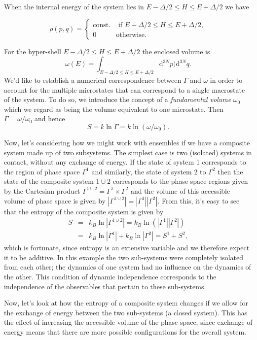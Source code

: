 When the internal energy of the system lies in $E-\Delta/2 \leq H \leq E+\Delta/2$ we have


\[ 
	\rho(p,q) = 
\begin{cases} 
      \mbox{const.} & \mbox{ if } E-\Delta/2 \leq H \leq E+\Delta/2, \\
      0 & \mbox{otherwise.} 
   \end{cases}
\]

For the hyper-shell $E-\Delta/2\leq H \leq E+\Delta/2$ the enclosed volume is
\[
\omega(E) = \int_{E-\Delta/2\leq H \leq E+\Delta/2} \mathrm{d}^{3N}p)\mathrm{d}^{3N}q.
\]
We'd like to establish a numerical correspondence between $\Gamma$ and $\omega$ in order to account for the multiple microstates that can correspond to a single macrostate of the system. To do so, we introduce the concept of a \emph{fundamental volume} $\omega_0$ which we regard as being the volume equivalent to one microstate. Then $\Gamma = \omega/\omega_0$ and hence
\[
S =k \ln\Gamma = k\ln(\omega/\omega_0).
\]


Now, let's considering how we might work with ensembles if we have a composite system made up of two subsystems. The simplest case is two (isolated) systems in contact, without any exchange of energy. If the state of system 1 corresponds to the region of phase space $\Gamma^1$ and similarly, the state of system 2 to $\Gamma^2$ then the state of the composite system $1\cup 2$ corresponds to the phase space regions given by the Cartesian product $\Gamma^{1\cup 2}=\Gamma^1\times\Gamma^2$ and the volume of this accessible volume of phase space is given by $|\Gamma^{1\cup 2}|=|\Gamma^1||\Gamma^2|$. From this, it's easy to see that the entropy of the composite system is given by
\begin{eqnarray*}
	S &=& k_B\ln|\Gamma^{1\cup 2}| = k_B\ln(|\Gamma^1||\Gamma^2|)\\
		&=& k_B\ln|\Gamma^1| + k_B\ln|\Gamma^2| = S^1 + S^2,
\end{eqnarray*}
which is fortunate, since entropy is an extensive variable and we therefore expect it to be additive.
In this example the two sub-systems were completely isolated from each other; the dynamics of one system had no influence on the dynamics of the other. This condition of dynamic independence corresponds to the independence of the observables that pertain to these sub-systems.

Now, let's look at how the entropy of a composite system changes if we allow for the exchange of energy between the two sub-systems (a closed system). This has the effect of increasing the accessible volume of the phase space, since exchange of energy means that there are more possible configurations for the overall system.

